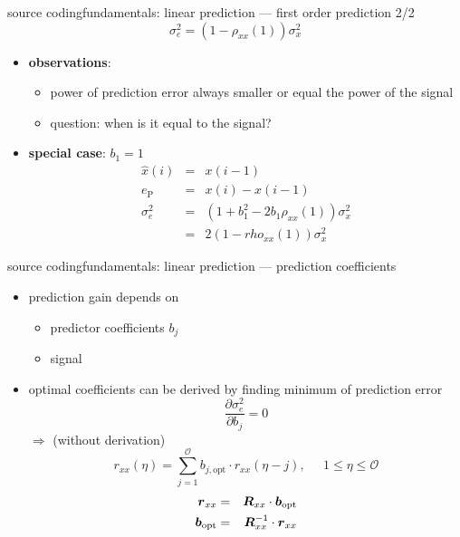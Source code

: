 	\begin{frame}{source coding}{fundamentals: linear prediction --- first order prediction 2/2}
        \begin{equation*}
            \sigma_e^2 = (1-\rho_{xx}(1))\sigma_x^2
        \end{equation*}
        
        \begin{itemize}
            \item             \textbf{observations}:
            \begin{itemize}
                \item   power of prediction error always smaller or equal the power of the signal
                \item   question: when is it equal to the signal?
            \end{itemize}
            \pause
            \item   \textbf{special case}: $b_1 = 1$
                \begin{eqnarray*}
                    \hat{x}(i) &=& x(i-1)\\
                    e_\mathrm{P} &=& x(i) - x(i-1)\\
                    \sigma_e^2 &=& (1 + b_1^2 -2b_1\rho_{xx}(1))\sigma_x^2\\
                    &=& 2(1-rho_{xx}(1))\sigma_x^2
                \end{eqnarray*}
        \end{itemize}
	\end{frame}
	\begin{frame}{source coding}{fundamentals: linear prediction --- prediction coefficients}
		\begin{itemize}
			\item	prediction gain depends on
				\begin{itemize}
					\item	predictor coefficients $b_j$
					\item	signal
				\end{itemize}
			\pause
			\item	optimal coefficients can be derived by finding minimum of prediction error
				\begin{equation*}
					\frac{\partial \sigma_e^2}{\partial b_j} = 0
				\end{equation*}
				$\Rightarrow$ (without derivation)
			\begin{equation*}
				r_{xx}(\eta) = \sum\limits_{j=1}^{\mathcal{O}}{b_{j,\mathrm{opt}}\cdot r_{xx}(\eta-j)} ,\;\;\;\;\; 1 \leq\eta\leq\mathcal{O} 
			\end{equation*}	
            \begin{eqnarray*}
                \vec{r}_{xx} &=& \mat{R}_{xx}\cdot \vec{b}_\mathrm{opt}\\
                \vec{b}_\mathrm{opt} &=& \mat{R}_{xx}^{-1}\cdot \vec{r}_{xx}
            \end{eqnarray*}
		\end{itemize}						
	\end{frame}
